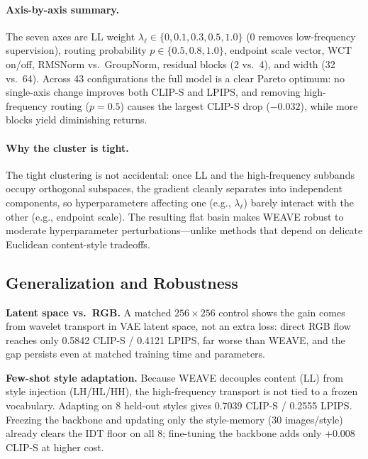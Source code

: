 \documentclass[letterpaper]{article}
\begin{document}
\paragraph{Axis-by-axis summary.}
The seven axes are LL weight $\lambda_\ell\in\{0,0.1,0.3,0.5,1.0\}$ (0 removes low-frequency supervision), routing probability $p\in\{0.5,0.8,1.0\}$, endpoint scale vector, WCT on/off, RMSNorm vs.\ GroupNorm, residual blocks (2 vs.\ 4), and width (32 vs.\ 64).
Across 43 configurations the full model is a clear Pareto optimum: no single-axis change improves both CLIP-S and LPIPS, and removing high-frequency routing ($p{=}0.5$) causes the largest CLIP-S drop ($-0.032$), while more blocks yield diminishing returns.

\paragraph{Why the cluster is tight.}
The tight clustering is not accidental: once LL and the high-frequency subbands occupy orthogonal subspaces, the gradient cleanly separates into independent components, so hyperparameters affecting one (e.g., $\lambda_\ell$) barely interact with the other (e.g., endpoint scale).
The resulting flat basin makes WEAVE robust to moderate hyperparameter perturbations---unlike methods that depend on delicate Euclidean content-style tradeoffs.









\subsection{Generalization and Robustness}
\label{sec:gen}

\textbf{Latent space vs.\ RGB.}
A matched $256{\times}256$ control shows the gain comes from wavelet transport in VAE latent space, not an extra loss: direct RGB flow reaches only 0.5842 CLIP-S / 0.4121 LPIPS, far worse than WEAVE, and the gap persists even at matched training time and parameters.

\textbf{Few-shot style adaptation.}
Because WEAVE decouples content (LL) from style injection (LH/HL/HH), the high-frequency transport is not tied to a frozen vocabulary.
Adapting on 8 held-out styles gives 0.7039 CLIP-S / 0.2555 LPIPS.
Freezing the backbone and updating only the style-memory (30 images/style) already clears the IDT floor on all 8; fine-tuning the backbone adds only +0.008 CLIP-S at higher cost.
\end{document}
